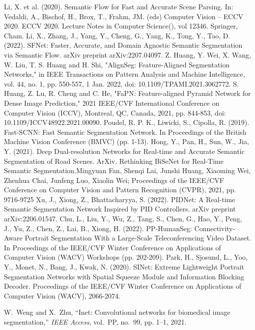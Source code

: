 \documentclass[11pt]{article}
\begin{document}
\begin{thebibliography}{99}
        Li, X. et al. (2020). Semantic Flow for Fast and Accurate Scene Parsing. In: Vedaldi, A., Bischof, H., Brox, T., Frahm, JM. (eds) Computer Vision – ECCV 2020. ECCV 2020. Lecture Notes in Computer Science(), vol 12346. Springer, Cham.
        Li, X., Zhang, J., Yang, Y., Cheng, G., Yang, K., Tong, Y.,  Tao, D. (2022). SFNet: Faster, Accurate, and Domain Agnostic Semantic Segmentation via Semantic Flow. arXiv preprint arXiv:2207.04097.
        Z. Huang, Y. Wei, X. Wang, W. Liu, T. S. Huang and H. Shi, "AlignSeg: Feature-Aligned Segmentation Networks," in IEEE Transactions on Pattern Analysis and Machine Intelligence, vol. 44, no. 1, pp. 550-557, 1 Jan. 2022, doi: 10.1109/TPAMI.2021.3062772.
        S. Huang, Z. Lu, R. Cheng and C. He, "FaPN: Feature-aligned Pyramid Network for Dense Image Prediction," 2021 IEEE/CVF International Conference on Computer Vision (ICCV), Montreal, QC, Canada, 2021, pp. 844-853, doi: 10.1109/ICCV48922.2021.00090.
        Poudel, R. P. K., Liwicki, S.,  Cipolla, R. (2019). Fast-SCNN: Fast Semantic Segmentation Network. In Proceedings of the British Machine Vision Conference (BMVC) (pp. 1-13).
        Hong, Y., Pan, H., Sun, W., Jia, Y. (2021). Deep Dual-resolution Networks for Real-time and Accurate Semantic Segmentation of Road Scenes. ArXiv.
        Rethinking BiSeNet for Real-Time Semantic Segmentation.Mingyuan Fan, Shenqi Lai, Junshi Huang, Xiaoming Wei, Zhenhua Chai, Junfeng Luo, Xiaolin Wei; Proceedings of the IEEE/CVF Conference on Computer Vision and Pattern Recognition (CVPR), 2021, pp. 9716-9725
        Xu, J., Xiong, Z., Bhattacharyya, S. (2022). PIDNet: A Real-time Semantic Segmentation Network Inspired by PID Controllers. arXiv preprint arXiv:2206.01547.
        Chu, L., Liu, Y., Wu, Z., Tang, S., Chen, G., Hao, Y., Peng, J., Yu, Z., Chen, Z., Lai, B., Xiong, H. (2022). PP-HumanSeg: Connectivity-Aware Portrait Segmentation With a Large-Scale Teleconferencing Video Dataset. In Proceedings of the IEEE/CVF Winter Conference on Applications of Computer Vision (WACV) Workshops (pp. 202-209).
        Park, H., Sjosund, L., Yoo, Y., Monet, N., Bang, J., Kwak, N. (2020). SINet: Extreme Lightweight Portrait Segmentation Networks with Spatial Squeeze Module and Information Blocking Decoder. Proceedings of the IEEE/CVF Winter Conference on Applications of Computer Vision (WACV), 2066-2074.


W.~Weng and X.~Zhu, ``Inet: Convolutional networks for biomedical image
  segmentation,'' \emph{IEEE Access}, vol.~PP, no.~99, pp. 1--1, 2021.





\end{thebibliography}
\end{document}
